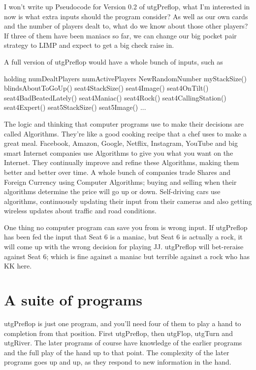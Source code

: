 I won't write up Pseudocode for Version 0.2 of utgPreflop, what I'm
interested in now is what extra inputs should the program consider?
As well as our own cards and the number of players dealt to, what do
we know about those other players? If three of them have been maniacs
so far, we can change our big pocket pair strategy to LIMP and expect
to get a big check raise in.

A full version of utgPreflop would have a whole bunch of inputs, such
as

holding
numDealtPlayers
numActivePlayers
NewRandomNumber
myStackSize()
blindsAboutToGoUp()
seat4StackSize()
seat4Image()
seat4OnTilt()
seat4BadBeatedLately()
seat4Maniac()
seat4Rock()
seat4CallingStation()
seat4Expert()
seat5StackSize()
seat5Image()
...

The logic and thinking that computer programs use to
make their decisions are called Algorithms. They're like a good
cooking recipe that a chef uses to make a great meal. Facebook,
Amazon, Google, Netflix, Instagram, YouTube and big smart Internet
companies use Algorithms to give you what you want on the Internet.
They continually improve and refine these Algorithms, making them
better and better over time. A whole bunch of companies trade Shares
and Foreign Currency using Computer Algorithms; buying and selling
when their algorithms determine the price will go up or down.
Self-driving cars use algorithms, continuously updating their input
from their cameras and also getting wireless updates about traffic and
road conditions.

One thing no computer program can save you from is wrong input.
If utgPreflop has been fed the input that Seat 6 is a maniac,
but Seat 6 is actually a rock, it will come up with the wrong decision
for playing JJ. utgPreflop will bet-reraise against Seat 6; which is
fine against a maniac but terrible against a rock who has KK here.


\section*{A suite of programs}

utgPreflop is just one program, and you'll need four of them to
play a hand to completion from that position. First utgPreflop,
then utgFlop, utgTurn and utgRiver. The later programs of course
have knowledge of the earlier programs and the full play of the hand
up to that point. The complexity of the later programs goes up and up,
as they respond to new information in the hand.

